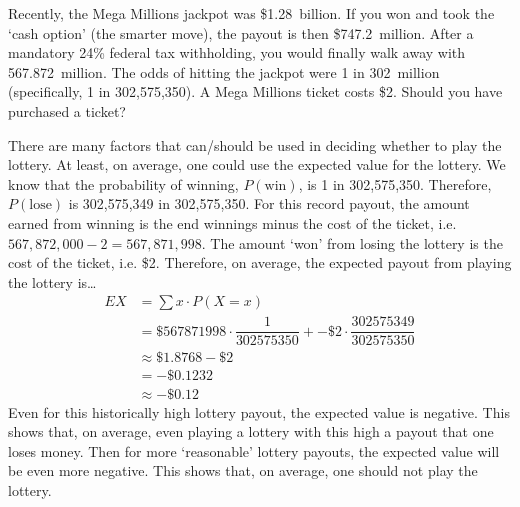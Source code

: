 \documentclass[11pt,letterpaper]{article}
\begin{document}
\newpage



 Recently, the Mega Millions jackpot was \$1.28~billion. If you won and took the `cash option' (the smarter move), the payout is then \$747.2~million. After a mandatory 24\% federal tax withholding, you would finally walk away with 567.872~million. The odds of hitting the jackpot were 1 in 302~million (specifically, 1 in 302,575,350). A Mega Millions ticket costs \$2. Should you have purchased a ticket? \pspace

\sol There are many factors that can/should be used in deciding whether to play the lottery. At least, on average, one could use the expected value for the lottery. We know that the probability of winning, $P(\text{win})$, is 1 in 302,575,350. Therefore, $P(\text{lose})$ is 302,575,349 in 302,575,350. For this record payout, the amount earned from winning is the end winnings minus the cost of the ticket, i.e. $567,872,000 - 2= 567,871,998$. The amount `won' from losing the lottery is the cost of the ticket, i.e. \$2. Therefore, on average, the expected payout from playing the lottery is\dots
	\[
	\begin{aligned}
	EX&= \sum x \cdot P(X= x) \\[0.3cm]
	&= \$567871998 \cdot \dfrac{1}{302575350} + -\$2 \cdot \dfrac{302575349}{302575350} \\[0.3cm]
	&\approx \$1.8768 - \$2 \\[0.3cm]
	&= -\$0.1232 \\[0.3cm]
	&\approx -\$0.12
	\end{aligned}
	\]
Even for this historically high lottery payout, the expected value is negative. This shows that, on average, even playing a lottery with this high a payout that one loses money. Then for more `reasonable' lottery payouts, the expected value will be even more negative. This shows that, on average, one should not play the lottery. 
\end{document}
